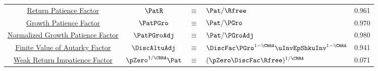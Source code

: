 \documentclass[\econtexRoot/BufferStockTheory]{subfiles}
\begin{document}
\begin{table}
{\begin{tabular}{|c|ccl|c|}
\href{https://\owner.github.io/BufferStockTheory\#RPF}{Return Patience Factor}                      & $\PatR$ & $\equiv$ & $\Pat/\Rfree $     & 0.961 \\
\href{https://\owner.github.io/BufferStockTheory\#GPFRaw}{\phantom{Normalized~}Growth Patience Factor}    & $\PatPGro$ & $\equiv$ & $\Pat/\PGro $      & 0.970 \\
\href{https://\owner.github.io/BufferStockTheory\#GPF}{Normalized Growth Patience Factor}                      & $\PatPGroAdj$ & $\equiv$ & $ \Pat/\PGroAdj$& 0.980 \\
\href{https://\owner.github.io/BufferStockTheory\#FVAF}{Finite Value of Autarky Factor}         & $\DiscAltuAdj $ & $\equiv$ & $ \DiscFac \PGro^{1-\CRRA}\uInvEpShkuInv^{1-\CRRA}$       & 0.941 \\ 
\href{https://\owner.github.io/BufferStockTheory\#WRICCond}{Weak Return Impatience Factor}         & $\pZero^{1/\CRRA} \Pat $ & $\equiv$ & $ (\pZero \DiscFac \Rfree)^{1/\CRRA}$       & 0.071 \\ \hline
\end{tabular}
} %
\settowidth\TableWidth{\usebox{\Calibration}}
\usebox{\Calibration}

\end{table}
%
\end{document}

